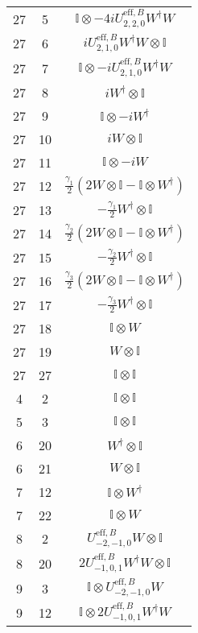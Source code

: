 \begin{longtable}{ccc}
	27 & 5  & \(\mathbb{I} \otimes -4iU^{\mathrm{eff},B}_{2,2,0}W^{\dagger}W\) \\
	27 & 6  & \(iU^{\mathrm{eff},B}_{2,1,0}W^{\dagger}W \otimes \mathbb{I}\) \\
	27 & 7  & \(\mathbb{I} \otimes -iU^{\mathrm{eff},B}_{2,1,0}W^{\dagger}W\) \\
	27 & 8  & \(iW^{\dagger} \otimes \mathbb{I}\) \\
	27 & 9  & \(\mathbb{I} \otimes -iW^{\dagger}\) \\
	27 & 10 & \(iW \otimes \mathbb{I}\) \\
	27 & 11 & \(\mathbb{I} \otimes -iW\) \\
	27 & 12 & \(\frac{\gamma_{1}}{2}\left( 2W \otimes \mathbb{I} - \mathbb{I} \otimes W^{\dagger}\right)\)  \\
	27 & 13 & \(-\frac{\gamma_{1}}{2}W^{\dagger} \otimes \mathbb{I}\)  \\ 
	27 & 14 & \(\frac{\gamma_{2}}{2}\left( 2W \otimes \mathbb{I} - \mathbb{I} \otimes W^{\dagger} \right)\)  \\
	27 & 15 & \(-\frac{\gamma_{2}}{2}W^{\dagger} \otimes \mathbb{I}\)  \\
	27 & 16 & \(\frac{\gamma_{3}}{2}\left( 2W \otimes \mathbb{I} - \mathbb{I} \otimes W^{\dagger} \right)\) \\
	27 & 17 & \(-\frac{\gamma_{3}}{2}W^{\dagger} \otimes \mathbb{I} \)  \\
	27 & 18 & \(\mathbb{I} \otimes W\) \\
	27 & 19 & \(W \otimes \mathbb{I}\) \\
	\hline
	27 & 27 & \(\mathbb{I} \otimes \mathbb{I}\) \\
	\hline
	4  & 2  & \(\mathbb{I} \otimes \mathbb{I}\) \\
	5  & 3  & \(\mathbb{I} \otimes \mathbb{I}\) \\
	6  & 20 & \(W^{\dagger} \otimes \mathbb{I}\) \\
	6  & 21 & \(W \otimes \mathbb{I}\) \\
	7  & 12 & \(\mathbb{I} \otimes W^{\dagger}\) \\
	7  & 22 & \(\mathbb{I} \otimes W\) \\
	8  & 2  & \(U^{\mathrm{eff},B}_{-2,-1,0}W \otimes \mathbb{I}\) \\
	8  & 20 & \(2U^{\mathrm{eff},B}_{-1,0,1}W^{\dagger}W \otimes \mathbb{I}\) \\
	9  & 3  & \(\mathbb{I} \otimes U^{\mathrm{eff},B}_{-2,-1,0}W\) \\
	9  & 12 & \(\mathbb{I} \otimes 2U^{\mathrm{eff},B}_{-1,0,1}W^{\dagger}W\) \\

\end{longtable}
